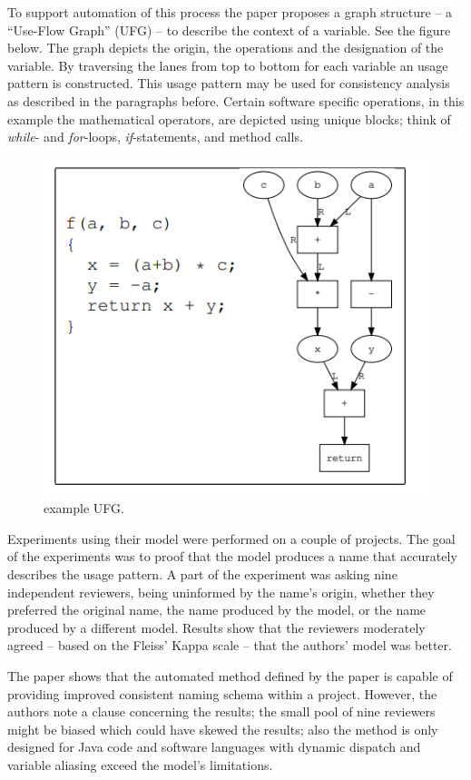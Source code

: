 \documentclass[a4paper,12pt]{article}
\begin{document}
\begin{multicols}{2}
To support automation of this process the paper proposes a graph structure -- a “Use-Flow Graph” (UFG) -- to describe the context of a variable. See the figure below. The graph depicts the origin, the operations and the designation of the variable. By traversing the lanes from top to bottom for each variable an usage pattern is constructed. This usage pattern  may be used for consistency analysis as described in the paragraphs before. Certain software specific operations, in this example the mathematical operators, are depicted using unique blocks; think of \textit{while}- and \textit{for}-loops, \textit{if}-statements, and method calls. 

\begin{figure}[ht]
    \centering
    \includegraphics[width=0.7\linewidth]{ufg}
    \caption{example UFG.}
    \label{fig:ufg}
\end{figure}
\hfill
\FloatBarrier

Experiments using their model were performed on a couple of projects. The goal of the experiments was to proof that the model produces a name that accurately describes the usage pattern. A part of the experiment was asking nine independent reviewers, being uninformed by the name's origin, whether they preferred the original name, the name produced by the model, or the name produced by a different model. Results show that the reviewers moderately agreed -- based on the Fleiss' Kappa scale -- that the authors' model was better.
    
The paper shows that the automated method defined by the paper is capable of providing improved consistent naming schema within a project. However, the authors note a clause concerning the results; the small pool of nine reviewers might be biased which could have skewed the results; also the method is only designed for Java code and software languages with dynamic dispatch and variable aliasing exceed the model's limitations.


\end{multicols}
\end{document}
